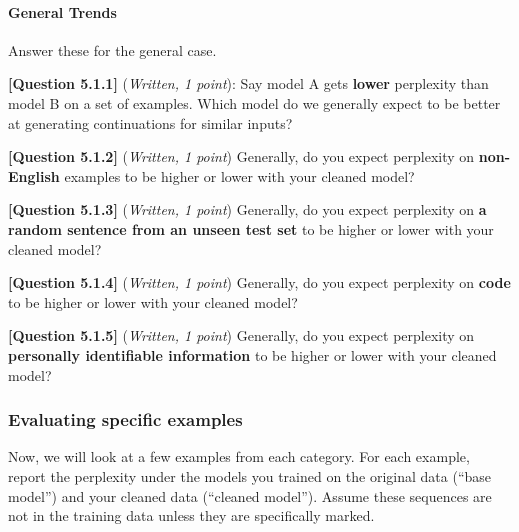 \documentclass[leqno,12pt]{article}
\begin{document}
\paragraph{General Trends} Answer these for the general case.

\noindent \textbf{[Question 5.1.1]} (\emph{Written, 1 point}): Say model A gets \textbf{lower} perplexity than model B on a set of examples. Which model do we generally expect to be better at generating continuations for similar inputs? \begin{tcolorbox}[fit,height=1cm, blank, borderline={1pt}{-2pt}]\end{tcolorbox}

\noindent \textbf{[Question 5.1.2]} (\emph{Written, 1 point}) Generally, do you expect perplexity on \textbf{non-English} examples to be higher or lower with your cleaned model?  \begin{tcolorbox}[fit,height=1cm, blank, borderline={1pt}{-2pt}]
\end{tcolorbox}

\noindent \textbf{[Question 5.1.3]} (\emph{Written, 1 point}) Generally, do you expect perplexity on \textbf{a random sentence from an unseen test set} to be higher or lower with your cleaned model? \begin{tcolorbox}[fit,height=1cm, blank, borderline={1pt}{-2pt}]
\end{tcolorbox}

\noindent \textbf{[Question 5.1.4]} (\emph{Written, 1 point}) Generally, do you expect perplexity on \textbf{code} to be higher or lower with your cleaned model? \begin{tcolorbox}[fit,height=1cm, blank, borderline={1pt}{-2pt}]
\end{tcolorbox}

\noindent \textbf{[Question 5.1.5]} (\emph{Written, 1 point}) Generally, do you expect perplexity on \textbf{personally identifiable information} to be higher or lower with your cleaned model? \begin{tcolorbox}[fit,height=1cm, blank, borderline={1pt}{-2pt}]
\end{tcolorbox}

\subsubsection{Evaluating specific examples}
\noindent Now, we will look at a few examples from each category. For each example, report the perplexity under the models you trained on the original data (``base model'') and your cleaned data (``cleaned model'').  Assume these sequences are not in the training data unless they are specifically marked.
\end{document}
